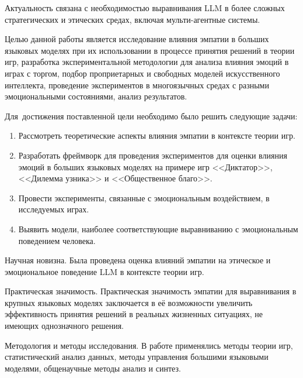 
Актуальность связана с необходимостью выравнивания LLM в более сложных стратегических и этических средах, включая мульти-агентные системы.


Целью данной работы является исследование влияния эмпатии в больших
языковых моделях при их использовании в процессе принятия решений в
теории игр, разработка экспериментальной методологии для анализа влияния
эмоций в играх с торгом, подбор проприетарных и свободных моделей
искусственного интеллекта, проведение экспериментов в многоязычных
средах с разными эмоциональными состояниями, анализ результатов.

Для~достижения поставленной цели необходимо было решить следующие задачи:
\begin{enumerate}[label=\arabic*)] %
  \item Рассмотреть теоретические аспекты влияния эмпатии в контексте теории игр.
  \item Разработать фреймворк для проведения экспериментов для оценки влияния эмоций в больших языковых моделях на примере игр <<Диктатор>>, <<Дилемма узника>> и <<Общественное благо>>.
  \item Провести эксперименты, связанные с эмоциональным воздействием, в исследуемых играх.
  \item Выявить модели, наиболее соответствующие выравниванию с эмоциональным поведением человека.
\end{enumerate}


Научная новизна.
Была проведена оценка влияний эмпатии на этическое и эмоциональное поведение LLM в контексте теории игр.

Практическая значимость. Практическая значимость эмпатии для выравнивания в крупных языковых моделях заключается в её возможности увеличить эффективность принятия решений в реальных жизненных ситуациях, не имеющих однозначного решения. 

Методология и методы исследования. В работе применялись методы теории игр, статистический анализ данных, методы управления большими языковыми моделями, общенаучные методы анализ и синтез.

